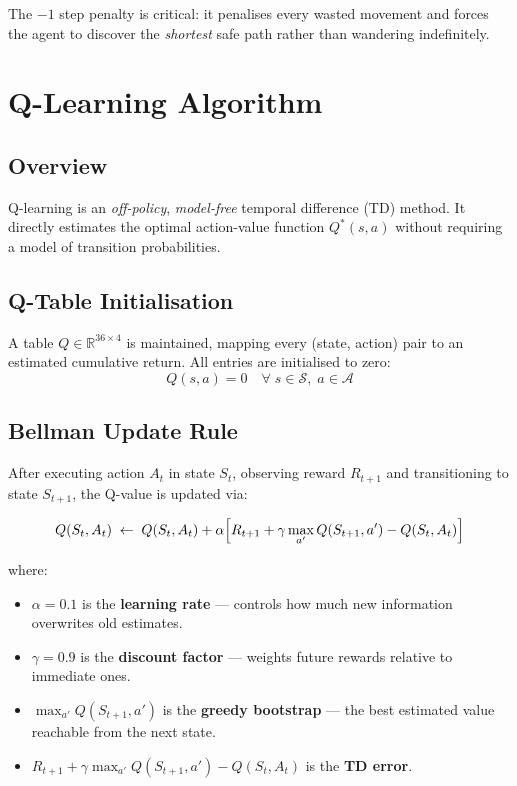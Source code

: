 \documentclass[12pt]{article}
\begin{document}
The $-1$ step penalty is critical: it penalises every wasted movement and
forces the agent to discover the \emph{shortest} safe path rather than
wandering indefinitely.

\section{Q-Learning Algorithm}

\subsection{Overview}

Q-learning is an \emph{off-policy}, \emph{model-free}
temporal difference (TD) method. It directly estimates the optimal
action-value function $Q^*(s, a)$ without requiring a model of transition
probabilities.

\subsection{Q-Table Initialisation}

A table $Q \in \mathbb{R}^{36 \times 4}$ is maintained, mapping every
(state, action) pair to an estimated cumulative return. All entries are
initialised to zero:
\[
    Q(s, a) = 0 \quad \forall\; s \in \mathcal{S},\; a \in \mathcal{A}
\]

\subsection{Bellman Update Rule}

After executing action $A_t$ in state $S_t$, observing reward $R_{t+1}$ and
transitioning to state $S_{t+1}$, the Q-value is updated via:

\begin{equation}\label{eq:bellman}
    Q(S_t, A_t) \;\leftarrow\; Q(S_t, A_t)
    + \alpha \Bigl[
        R_{t+1} + \gamma \max_{a'} Q(S_{t+1}, a') - Q(S_t, A_t)
    \Bigr]
\end{equation}

where:
\begin{itemize}
    \item $\alpha = 0.1$ is the \textbf{learning rate} --- controls how much
          new information overwrites old estimates.
    \item $\gamma = 0.9$ is the \textbf{discount factor} --- weights future
          rewards relative to immediate ones.
    \item $\max_{a'} Q(S_{t+1}, a')$ is the \textbf{greedy bootstrap} --- the
          best estimated value reachable from the next state.
    \item $R_{t+1} + \gamma \max_{a'} Q(S_{t+1}, a') - Q(S_t, A_t)$ is the
          \textbf{TD error}.
\end{itemize}
\end{document}
